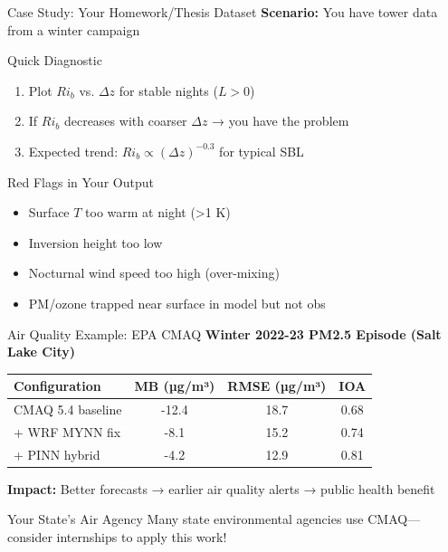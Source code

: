 \documentclass[10pt,aspectratio=169]{beamer}
\begin{document}
\begin{frame}{Case Study: Your Homework/Thesis Dataset}
  \textbf{Scenario:} You have tower data from a winter campaign
  
  \vspace{0.3cm}
  \begin{exampleblock}{Quick Diagnostic}
    \begin{enumerate}
      \item Plot $Ri_b$ vs. $\Delta z$ for stable nights ($L > 0$)
      \item If $Ri_b$ \alert{decreases} with coarser $\Delta z$ → you have the problem
      \item Expected trend: $Ri_b \propto (\Delta z)^{-0.3}$ for typical SBL
    \end{enumerate}
  \end{exampleblock}
  
  \pause
  \vspace{0.3cm}
  \begin{alertblock}{Red Flags in Your Output}
    \begin{itemize}
      \item Surface $T$ too warm at night (>1 K)
      \item Inversion height too low
      \item Nocturnal wind speed too high (over-mixing)
      \item PM/ozone trapped near surface in model but not obs
    \end{itemize}
  \end{alertblock}
\end{frame}

\begin{frame}{Air Quality Example: EPA CMAQ}
  \textbf{Winter 2022-23 PM2.5 Episode (Salt Lake City)}
  
  \vspace{0.3cm}
  \begin{table}
    \centering
    \small
    \begin{tabular}{lccc}
      \toprule
      \textbf{Configuration} & \textbf{MB (µg/m³)} & \textbf{RMSE (µg/m³)} & \textbf{IOA} \\
      \midrule
      CMAQ 5.4 baseline & -12.4 & 18.7 & 0.68 \\
      + WRF MYNN fix & -8.1 & 15.2 & 0.74 \\
      + PINN hybrid & \alert{-4.2} & \alert{12.9} & \alert{0.81} \\
      \bottomrule
    \end{tabular}
  \end{table}
  
  \vspace{0.3cm}
  \textbf{Impact:} Better forecasts → earlier air quality alerts → \alert{public health benefit}
  
  \vspace{0.3cm}
  \begin{block}{Your State's Air Agency}
    Many state environmental agencies use CMAQ—\\
    consider internships to apply this work!
  \end{block}
\end{frame}
\end{document}
